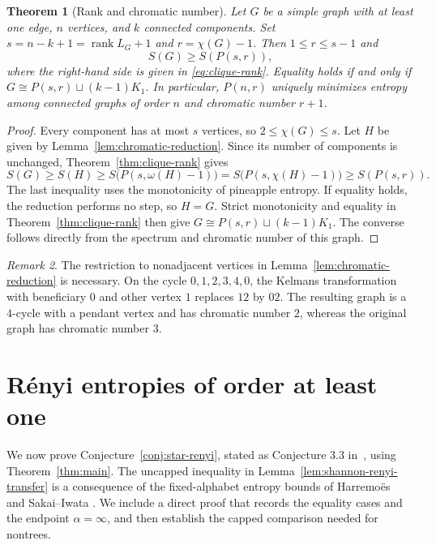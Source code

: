 \documentclass[11pt,a4paper,reqno]{amsart}
\newtheorem{theorem}{Theorem}[section]
\theoremstyle{remark}
\newtheorem{remark}[theorem]{Remark}
\newcommand{\Ent}{S}
\newcommand{\Pine}{P}
\numberwithin{equation}{section}
\begin{document}
\begin{theorem}[Rank and chromatic number]
\label{thm:chromatic-rank}
Let $G$ be a simple graph with at least one edge, $n$ vertices, and $k$
connected components. Set $s=n-k+1=\operatorname{rank}L_G+1$ and
$r=\chi(G)-1$. Then $1\le r\le s-1$ and
\begin{equation}\label{eq:chromatic-rank}
 \Ent(G)\ge\Ent(\Pine(s,r)),
\end{equation}
where the right-hand side is given in \eqref{eq:clique-rank}.
Equality holds if and only if
$G\cong\Pine(s,r)\sqcup(k-1)K_1$.
In particular, $\Pine(n,r)$ uniquely minimizes entropy among connected
graphs of order $n$ and chromatic number $r+1$.
\end{theorem}
\begin{proof}
Every component has at most $s$ vertices, so $2\le\chi(G)\le s$.
Let $H$ be given by Lemma~\ref{lem:chromatic-reduction}. Since its
number of components is unchanged, Theorem~\ref{thm:clique-rank}
gives
\[
 \Ent(G)\ge\Ent(H)
 \ge\Ent\bigl(\Pine(s,\omega(H)-1)\bigr)
 =\Ent\bigl(\Pine(s,\chi(H)-1)\bigr)
 \ge\Ent(\Pine(s,r)).
\]
The last inequality uses the monotonicity of pineapple entropy.
If equality holds, the reduction performs no step, so $H=G$.
Strict monotonicity and equality in Theorem~\ref{thm:clique-rank}
then give $G\cong\Pine(s,r)\sqcup(k-1)K_1$.
The converse follows directly from the spectrum and chromatic number
of this graph.
\end{proof}

\begin{remark}
The restriction to nonadjacent vertices in
Lemma~\ref{lem:chromatic-reduction} is necessary. On the cycle
$0,1,2,3,4,0$, the Kelmans transformation with beneficiary $0$ and other
vertex $1$ replaces $12$ by $02$. The resulting graph is a $4$-cycle
with a pendant vertex and has chromatic number $2$, whereas the
original graph has chromatic number $3$.
\end{remark}

\section{R\'enyi entropies of order at least one}
\label{sec:all-renyi}

We now prove Conjecture~\ref{conj:star-renyi}, stated as
Conjecture 3.3 in~\cite{Dairyko2017}, using Theorem~\ref{thm:main}.
The uncapped inequality in Lemma~\ref{lem:shannon-renyi-transfer}
is a consequence of the fixed-alphabet entropy bounds of
Harremo\"es~\cite[Theorem 3]{Harremoes2009} and Sakai--Iwata
\cite[extended version, Theorem 1 and Corollary 1]{SakaiIwata2016}.
We include a direct proof that records the equality cases and the
endpoint $\alpha=\infty$, and then establish the capped comparison
needed for nontrees.
\end{document}
